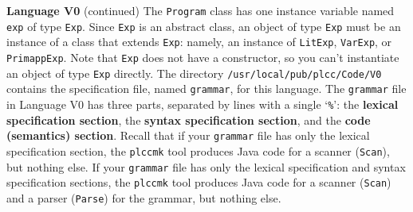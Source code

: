 \begin{minipage}[t]{\sw}
\slidenumber
\LARGE
{\bf Language V0} (continued)\exx
The \verb'Program' class has one instance variable named \verb'exp'
of type \verb'Exp'.
Since \verb'Exp' is an abstract class,
an object of type \verb'Exp' must be an instance of a class
that extends \verb'Exp': namely, an instance
of \verb'LitExp', \verb'VarExp', or \verb'PrimappExp'.
Note that \verb'Exp' does not have a constructor,
so you can't instantiate an object of type \verb'Exp' directly.\exx
The directory \verb'/usr/local/pub/plcc/Code/V0'
contains the specification file, named \verb'grammar', for this language.\exx
The \verb'grammar' file in Language V0
has three parts, separated by lines with a single `\verb'%'':
the {\bf lexical specification section},
the {\bf syntax specification section},
and the {\bf code (semantics) section}.\exx
Recall that if your \verb'grammar' file has only
the lexical specification section,
the \verb'plccmk' tool produces Java code
for a scanner (\verb'Scan'),
but nothing else.
If your \verb'grammar' file has only
the lexical specification and syntax specification sections,
the \verb'plccmk' tool produces Java code
for a scanner (\verb'Scan') and a parser (\verb'Parse') for the grammar,
but nothing else.
\end{minipage}
\clearpage
